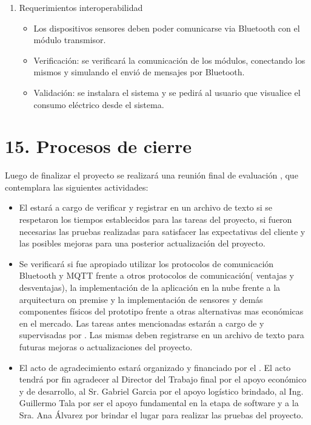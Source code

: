 \documentclass[
11pt, %
]{charter}
\begin{document}
\begin{enumerate}
\begin{itemize}
		\end{itemize}
	
	\item Requerimientos interoperabilidad
	\begin{itemize}
		\item Los dispositivos sensores deben poder comunicarse via Bluetooth con el módulo transmisor.
		
	\end{itemize}
		\begin{itemize}
			\item Verificación: se verificará la comunicación de los módulos, conectando los mismos y simulando el envió de mensajes por Bluetooth.
			\item Validación: se instalara el sistema y se pedirá al usuario que visualice el consumo eléctrico desde el sistema.
			\end{itemize}
	
\end{enumerate}



\section{15. Procesos de cierre}    
\label{sec:cierre}



Luego de finalizar el proyecto se realizará una reunión final de evaluación , que contemplara las siguientes actividades:

\begin{itemize}
	\item El {\authorname}  estará a cargo de verificar y registrar en un archivo de texto si se respetaron los tiempos establecidos para las tareas del proyecto, si fueron necesarias las pruebas realizadas para satisfacer las expectativas del cliente y las posibles mejoras para una posterior actualización del proyecto.
	\item Se verificará si fue apropiado utilizar los protocolos de comunicación Bluetooth y MQTT frente a otros protocolos de comunicación( ventajas y desventajas), la implementación de la aplicación en la nube frente a la arquitectura on premise y la implementación de sensores y demás componentes físicos del prototipo frente a otras alternativas mas económicas en el mercado.
	Las tareas antes mencionadas estarán a cargo de {\authorname} y supervisadas por \supname. Las mismas deben registrarse en un archivo de texto para futuras mejoras o actualizaciones del proyecto.
	\item El acto de agradecimiento estará organizado y financiado por el  {\authorname}. El acto tendrá por fin agradecer al Director del Trabajo final  {\supname} por el apoyo económico y de desarrollo, al Sr. Gabriel Garcia por el apoyo logístico brindado, al 
Ing. Guillermo Tala  por ser el apoyo fundamental en la etapa de software y a la  Sra. Ana Álvarez  por brindar el lugar para realizar las pruebas del proyecto.
\end{itemize}	  
	  
\end{document}
